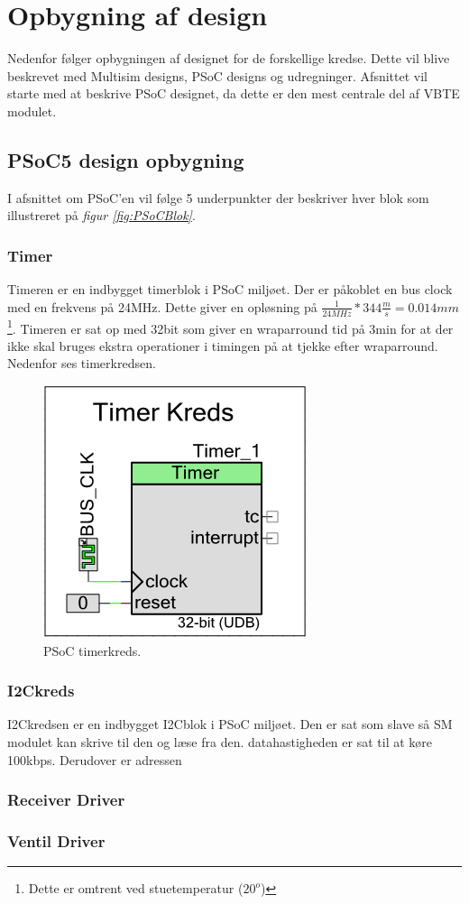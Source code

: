 \section{Opbygning af design}
Nedenfor følger opbygningen af designet for de forskellige kredse. Dette vil blive beskrevet med Multisim designs, PSoC designs og udregninger. Afsnittet vil starte med at beskrive PSoC designet, da dette er den mest centrale del af VBTE modulet.

\subsection{PSoC5 design opbygning}
I afsnittet om PSoC'en vil følge 5 underpunkter der beskriver hver blok som illustreret på \textit{figur \ref{fig:PSoCBlok}}.
\subsubsection{Timer}
Timeren er en indbygget timerblok i PSoC miljøet. Der er påkoblet en bus clock med en frekvens på 24MHz. Dette giver en opløsning på $\frac{1}{24MHz}*344\frac{m}{s}=0.014mm$\footnote{Dette er omtrent ved stuetemperatur ($20^{o}$)}. Timeren er sat op med 32bit som giver en wraparround tid på 3min for at der ikke skal bruges ekstra operationer i timingen på at tjekke efter wraparround. Nedenfor ses timerkredsen.
\begin{figure}[H]
\centering
\includegraphics[scale=.5]{billeder/psoctimerkreds}
\caption{PSoC timerkreds.}
\label{fig:timerkreds}
\end{figure}
\subsubsection{I2Ckreds}
I2Ckredsen er en indbygget I2Cblok i PSoC miljøet. Den er sat som slave så SM modulet kan skrive til den og læse fra den. datahastigheden er sat til at køre 100kbps. Derudover er adressen 
\subsubsection{Receiver Driver}
\subsubsection{Ventil Driver}
